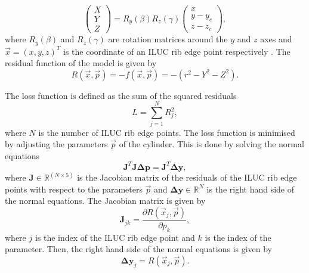 \begin{equation}
    \begin{pmatrix}
        X \\
        Y \\
        Z
    \end{pmatrix} =
    R_y(\beta) R_z(\gamma) \begin{pmatrix}
        x       \\
        y - y_c \\
        z - z_c
    \end{pmatrix},
    \label{eq:cylinder_coordinates}
\end{equation}
where $R_y(\beta)$ and $R_z(\gamma)$ are rotation matrices around the $y$ and $z$ axes and $\vec{x} = (x, y, z)^T$ is the coordinate of an ILUC rib edge point respectively \cite[equation 5]{cylinder_fit}. 
The residual function of the model is given by
\begin{equation}
    R(\vec{x},\vec{p}) = -f(\vec{x},\vec{p}) = -(r^2 - Y^2 - Z^2).
    \label{eq:cylinder_residual}
\end{equation}

The loss function is defined as the sum of the squared residuals
\begin{equation}
    L = \sum_{j=1}^{N} R_j^2,
    \label{eq:cylinder_loss}
\end{equation}
where $N$ is the number of ILUC rib edge points. The loss function is minimised by adjusting the parameters $\vec{p}$ of the cylinder. This is done by solving the normal equations
\begin{equation}
    \mathbf{J}^T \mathbf{J} \mathbf{\Delta p} = \mathbf{J}^T \mathbf{\Delta y},
    \label{eq:cylinder_normal_equations}
\end{equation}
where $\mathbf{J} \in \mathbb{R}^{(N\times5)}$ is the Jacobian matrix of the residuals of the ILUC rib edge points with respect to the parameters $\vec{p}$ and $\mathbf{\Delta y}\in\mathbb{R}^N$ is the right hand side of the normal equations. The Jacobian matrix is given by
\begin{equation}
    \mathbf{J}_{jk} = \frac{\partial R(\vec{x}_j, \vec{p})}{\partial p_k}, 
\end{equation}
where $j$ is the index of the ILUC rib edge point and $k$ is the index of the parameter. Then, the right hand side of the normal equations is given by
\begin{equation}
    \mathbf{\Delta y}_j = R(\vec{x}_j, \vec{p}).
    \label{eq:cylinder_rhs}
\end{equation}

